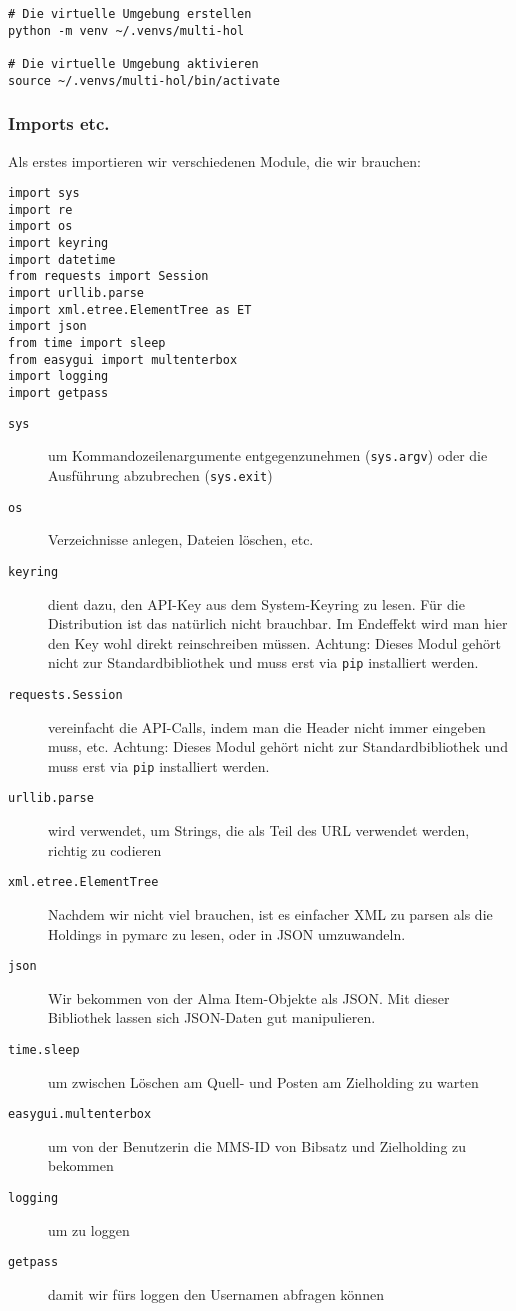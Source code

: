 \documentclass[10pt, a4paper]{scrartcl}
\begin{document}
\begin{verbatim}
# Die virtuelle Umgebung erstellen
python -m venv ~/.venvs/multi-hol

# Die virtuelle Umgebung aktivieren
source ~/.venvs/multi-hol/bin/activate
\end{verbatim}


\subsubsection{Imports etc.}
\label{sec:org3c112c6}
Als erstes importieren wir verschiedenen Module, die wir brauchen:

\begin{verbatim}
import sys
import re
import os
import keyring
import datetime
from requests import Session
import urllib.parse
import xml.etree.ElementTree as ET
import json
from time import sleep
from easygui import multenterbox
import logging
import getpass
\end{verbatim}

\begin{description}
\item[{\texttt{sys}}] um Kommandozeilenargumente entgegenzunehmen (\texttt{sys.argv}) oder
die Ausführung abzubrechen (\texttt{sys.exit})
\item[{\texttt{os}}] Verzeichnisse anlegen, Dateien löschen, etc.
\item[{\texttt{keyring}}] dient dazu, den API-Key aus dem System-Keyring zu lesen. Für die
Distribution ist das natürlich nicht brauchbar. Im Endeffekt wird man hier
den Key wohl direkt reinschreiben müssen. Achtung: Dieses
Modul gehört nicht zur Standardbibliothek und muss erst via
\texttt{pip} installiert werden.
\item[{\texttt{requests.Session}}] vereinfacht die API-Calls, indem man die Header
nicht immer eingeben muss, etc. Achtung: Dieses Modul gehört
nicht zur Standardbibliothek und muss erst via \texttt{pip} installiert
werden.
\item[{\texttt{urllib.parse}}] wird verwendet, um Strings, die als Teil des URL
verwendet werden, richtig zu codieren
\item[{\texttt{xml.etree.ElementTree}}] Nachdem wir nicht viel brauchen, ist es
einfacher XML zu parsen als die Holdings in pymarc zu lesen, oder in
JSON umzuwandeln.
\item[{\texttt{json}}] Wir bekommen von der Alma Item-Objekte als JSON. Mit dieser Bibliothek
lassen sich JSON-Daten gut manipulieren.
\item[{\texttt{time.sleep}}] um zwischen Löschen am Quell- und Posten am Zielholding
zu warten
\item[{\texttt{easygui.multenterbox}}] um von der Benutzerin die MMS-ID von Bibsatz
und Zielholding zu bekommen
\item[{\texttt{logging}}] um zu loggen
\item[{\texttt{getpass}}] damit wir fürs loggen den Usernamen abfragen können
\end{description}
\end{document}
